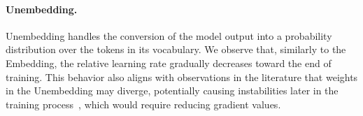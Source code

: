 \documentclass{article}
\theoremstyle{plain}
\theoremstyle{definition}
\theoremstyle{remark}
\begin{document}
    \paragraph{Unembedding.} 
    Unembedding handles the conversion of the model output into a probability distribution over the tokens in its vocabulary.
    We observe that, similarly to the Embedding, the relative learning rate gradually decreases toward the end of training. This behavior also aligns with observations in the literature that weights in the Unembedding may diverge, potentially causing instabilities later in the training process~\citep{chowdhery2022palm, zoph2022st}, which would require reducing gradient values. 
    
    
\end{document}
